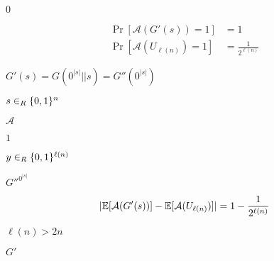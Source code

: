 \documentclass[10pt]{book}
\begin{document}
\begin{mdSnippets}
\begin{mdInlineSnippet}%
$0$\end{mdInlineSnippet}%
\begin{mdDisplaySnippet}[6f3a927ff9d1f33ec254c9cfd05bc952]%
\[%
\begin{aligned}
\Pr[\mathcal{A}(G'(s)) = 1] &=  1\\
\Pr[\mathcal{A}(U_{\ell(n)}) = 1] &= \frac{1}{2^{\ell(n)}}
\end{aligned}
\]%
\end{mdDisplaySnippet}%
\begin{mdInlineSnippet}[69424f59c4136ba1899aa1b42e5c5a62]%
$G'(s) = G(0^{|s|} || s) = G''(0^{|s|})$\end{mdInlineSnippet}%
\begin{mdInlineSnippet}[fe2bb9aa3a7df307e2e246e0f2092582]%
$s \in_R \{0,1\}^{n}$\end{mdInlineSnippet}%
\begin{mdInlineSnippet}[ad70146b431bea9ae74cf8385470c544]%
$\mathcal{A}$\end{mdInlineSnippet}%
\begin{mdInlineSnippet}[c4ca4238a0b923820dcc509a6f75849b]%
$1$\end{mdInlineSnippet}%
\begin{mdInlineSnippet}[528e8f16705644dc871edd53f53551c2]%
$y \in_R \{0,1\}^{\ell(n)}$\end{mdInlineSnippet}%
\begin{mdInlineSnippet}[f1021bcaf6a955a9764c5f2842c496c9]%
$G''^{0^|s|}$\end{mdInlineSnippet}%
\begin{mdDisplaySnippet}[7c5496fcb5cc2570562e0ca839a5084d]%
\[%
|\E[\mathcal{A}(G'(s))] - \E[\mathcal{A}(U_{\ell(n)})]| = 1 - \frac{1}{2^{\ell(n)}}  
\]%
\end{mdDisplaySnippet}%
\begin{mdInlineSnippet}%
$\ell(n) > 2n$\end{mdInlineSnippet}%
\begin{mdInlineSnippet}[b1c5660b1392ecb094b31a0e42253ff9]%
$G'$\end{mdInlineSnippet}%

\end{mdSnippets}
\end{document}
